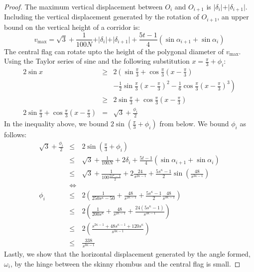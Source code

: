 \documentclass[10pt]{CSUNthesis}
\theoremstyle{plain}%
\theoremstyle{definition}
\theoremstyle{remark}
\newcommand{\lr}[1]{\left( #1 \right)}
\begin{document}
\begin{proof}
The maximum vertical displacement between $O_i$ and $O_{i+1}$ is $\vert \delta_i \vert + \vert \delta_{i+1} \vert$.  
Including the vertical displacement generated by the rotation of $O_{i+1}$, an upper bound on the vertical height of a corridor is:
$$v_\text{max}=\sqrt{3} + \frac{1}{100N} + \vert \delta_i \vert + \vert \delta_{i+1} \vert + \frac{5t-1}{4}  \lr{ \sin \alpha_{i+1} +  \sin \alpha_{i} }$$
The central flag can rotate upto the height of the polygonal diameter of $v_\text{max}$.  
Using the Taylor series of sine and the following substitution $x = \frac{\pi}{3} + \phi_i$:
\begin{eqnarray*}
2 \sin x &\geq&  2 \left( \sin \frac{\pi}{3} + \cos \frac{\pi}{3} \lr{x - \frac{\pi}{3}}\right.\\
&& \left.- \frac{1}{2} \sin \frac{\pi}{3} \lr{x - \frac{\pi}{3}}^2 - \frac{1}{6} \cos \frac{\pi}{3} \lr{x - \frac{\pi}{3}}^3\right)\\
&\geq&2 \sin \frac{\pi}{3} + \cos \frac{\pi}{3} \lr{x - \frac{\pi}{3}}\\
2  \sin \frac{\pi}{3} + \cos \frac{\pi}{3} \lr{x - \frac{\pi}{3}} &=& \sqrt{3} + \frac{\phi_i}{2} 
\end{eqnarray*}
In the inequality above, we bound $2 \sin  \lr{\frac{\pi}{3} + \phi_i}$ from below. 
We bound $\phi_i$ as follows: 
\begin{eqnarray*}
\sqrt{3} + \frac{\phi_i}{2}  &\leq & 2\sin \lr{ \frac{\pi}{3} + \phi_i }\\
&\leq&\sqrt{3} + \frac{1}{100N} + 2 \delta_i + \frac{5t-1}{4}  \lr{ \sin \alpha_{i+1} +  \sin \alpha_{i} }\\
&\leq& \sqrt{3} + \frac{1}{100 \frac{5s^\kappa - 1}{2}} + 2 \frac{24}{s^{2\kappa-1}} + \frac{5s^\kappa-1}{2}  \sin \lr{\frac{48}{s^{3\kappa-1}}}\\
&\iff&\\
\phi_i &\leq& 2 \lr{ \frac{1}{250s^\kappa - 50} +  \frac{48}{s^{2\kappa-1}} + \frac{5s^\kappa-1}{2} \frac{48}{s^{3\kappa-1}} }\\
&\leq& 2 \lr{ \frac{1}{200 s^\kappa} + \frac{48}{s^{2\kappa-1}} + \frac{24\lr{5s^\kappa - 1}}{s^{3\kappa-1}}}\\
 &\leq& 2 \lr{ \frac{s^{2\kappa - 1} + 48s^{\kappa - 1}+ 120 s^\kappa}{s^{3\kappa-1}}}\\
&\leq& \frac{338}{s^{3\kappa - 1}}
\end{eqnarray*}
Lastly, we show that the horizontal displacement generated by the angle formed, $\omega_i$, by the hinge between the skinny rhombus and the central flag is small.

\end{proof}
\end{document}
